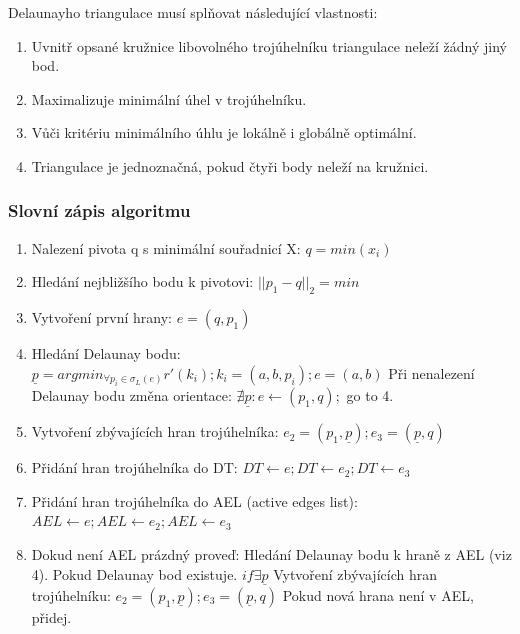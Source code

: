 \documentclass[a4paper,11pt,twoside]{article}
\begin{document}
\newpage
Delaunayho triangulace musí splňovat následující vlastnosti:

\begin{enumerate}
\item Uvnitř opsané kružnice libovolného trojúhelníku triangulace neleží žádný jiný bod.
\item Maximalizuje minimální úhel v trojúhelníku.
\item Vůči kritériu minimálního úhlu je lokálně i globálně optimální.
\item Triangulace je jednoznačná, pokud čtyři body neleží na kružnici.
\end{enumerate}

\subsubsection{Slovní zápis algoritmu}
\begin{enumerate}
\item Nalezení pivota q s minimální souřadnicí X:  $ q = min(x_i) $ 
\item Hledání nejbližšího bodu k pivotovi: $ ||p_1 - q||_2 = min  $
\item Vytvoření první hrany: $ e = (q, p_1) $ 
\item Hledání Delaunay bodu: $ \underline{p} = argmin_{\forall p_i \in \sigma_L (e)} r'(k_i); k_i = (a, b, p_i); e = (a, b)$ 
\subitem Při nenalezení Delaunay bodu změna orientace: $ \nexists \underline{p} : e \leftarrow (p_1, q);$ go to 4. 
\item Vytvoření zbývajících hran trojúhelníka: $ e_2 = (p_1,  \underline{p}); e_3 = ( \underline{p} , q) $
\item Přidání hran trojúhelníka do DT:  $ DT \leftarrow e; DT \leftarrow e_2; DT \leftarrow e_3  $  
\item Přidání hran trojúhelníka do AEL (active edges list):  $ AEL \leftarrow e; AEL \leftarrow e_2; AEL \leftarrow e_3  $  
\item Dokud není AEL prázdný proveď:
\subitem Hledání Delaunay bodu k hraně z AEL (viz 4).
\subitem Pokud Delaunay bod existuje. $ if \exists  \underline{p}$
\subsubitem Vytvoření zbývajících hran trojúhelníku:   $ e_2 = (p_1,  \underline{p}); e_3 = ( \underline{p} , q) $
\subsubitem Pokud nová hrana není v AEL, přidej.
\end{enumerate}

\newpage
\end{document}
